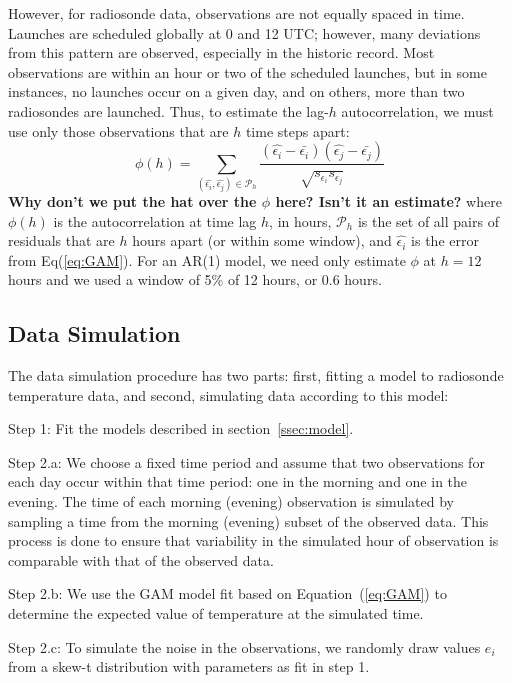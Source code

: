 \documentclass[12pt]{article}
\def\ni{\noindent}
\begin{document}
\begin{doublespacing}
However, for radiosonde data, observations are not equally spaced in time.  Launches are scheduled globally at 0 and 12 UTC; however, many deviations from this pattern are observed, especially in the historic record.  Most observations are within an hour or two of the scheduled launches, but in some instances, no launches occur on a given day, and on others, more than two radiosondes are launched.   Thus, to estimate the lag-$h$  autocorrelation, we must use only those observations that are $h$ time steps apart:
\begin{equation} \label{eq:ACF}
	\phi(h)=\sum_{(\widehat{\epsilon_i},\widehat{\epsilon_j}) \in \mathcal{P}_h} \frac{(\widehat{\epsilon_i}-\bar{\epsilon_i})(\widehat{\epsilon_j}-\bar{\epsilon_j})}{\sqrt{s_{\epsilon_i} s_{\epsilon_j}}}
\end{equation}
\textbf{Why don't we put the hat over the $\phi$ here?  Isn't it an estimate?}
\ni where $\phi(h)$ is the autocorrelation at time lag $h$, in hours, $\mathcal{P}_h$ is the set of all pairs of residuals that are $h$ hours apart (or within some window), and $\widehat{\epsilon_i}$ is the error from Eq(\ref{eq:GAM}).  For an AR(1) model, we need only estimate $\phi$ at $h=12$ hours and we used a window of 5\% of 12 hours, or 0.6 hours.

\subsection{Data Simulation}
\label{ssec:sim}

The data simulation procedure has two parts: first, fitting a model to radiosonde temperature data, and second, simulating data according to this model:

Step 1: Fit the models described in section~\ref{ssec:model}.

Step 2.a: We choose a fixed time period and assume that two observations for each day occur within that time period: one in the morning and one in the evening.  The time of each morning (evening) observation is simulated by sampling a time from the morning (evening) subset of the observed data.  This process is done to ensure that variability in the simulated hour of observation is comparable with that of the observed data.

Step 2.b: We use the GAM model fit based on Equation~(\ref{eq:GAM}) to determine the expected value of temperature at the simulated time.

Step 2.c: To simulate the noise in the observations, we randomly draw values $e_i$ from a skew-t distribution with parameters as fit in step 1.


\end{doublespacing}
\end{document}
